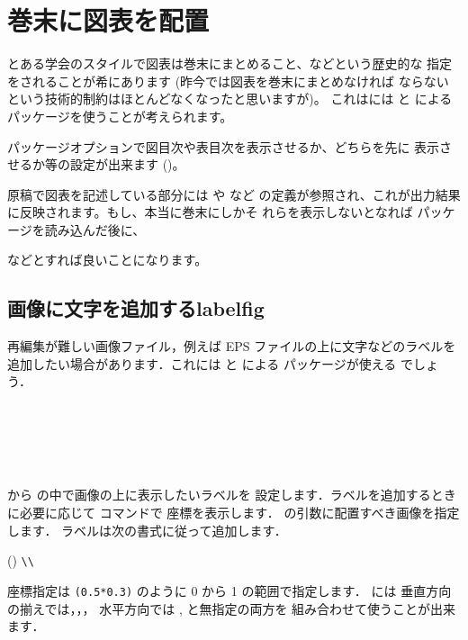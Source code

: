 
\section{巻末に図表を配置\texorpdfstring{\zdash}{---}}

とある学会のスタイルで図表は巻末にまとめること、などという歴史的な
指定をされることが希にあります (昨今では図表を巻末にまとめなければ
ならないという技術的制約はほとんどなくなったと思いますが)。
これはには と による 
 パッケージを使うことが考えられます。

パッケージオプションで図目次や表目次を表示させるか、どちらを先に
表示させるか等の設定が出来ます 
()。

原稿で図表を記述している部分には  や  など
の定義が参照され、これが出力結果に反映されます。もし、本当に巻末にしかそ
れらを表示しないとなれば  パッケージを読み込んだ後に、
\begin{inputex}
\let\tableplace\empty
\let\figureplace\empty
\end{inputex}
などとすれば良いことになります。

\subsection{画像に文字を追加する\zdash\textsf{labelfig}}

%
再編集が難しい画像ファイル，例えば EPS ファイルの上に文字などのラベルを
追加したい場合があります．これには  と
 による  パッケージが使える
でしょう．
\begin{Syntax}
 \\
\\
\\
 \\
\end{Syntax}
 から  の中で画像の上に表示したいラベルを
設定します．ラベルを追加するときに必要に応じて  コマンドで
座標を表示します． の引数に配置すべき画像を指定します．
ラベルは次の書式に従って追加します．
\begin{Syntax}
\string(\string*{}\string)  \verb|\\|
\end{Syntax}
座標指定は \verb|(0.5*0.3)| のように 0 から 1 の範囲で指定します．
には 垂直方向の揃えでは，，，
水平方向では ,  と無指定の両方を
組み合わせて使うことが出来ます．

